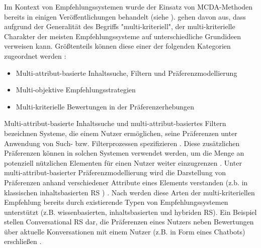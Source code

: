 Im Kontext von Empfehlungssystemen wurde der Einsatz von \ac{MCDA}-Metho\-den bereits in einigen Veröffentlichungen behandelt (siehe \cite{adomavicius:inproceedings:2}\cite{adomavicius:4:inbook}\cite{hdioud:inproceedings}\cite{lakiotaki:article}\cite{manouselis:article}\cite{zheng:inproceedings}).
\textcite[S. 849]{adomavicius:4:inbook} gehen davon aus, dass aufgrund der Generalität des Begriffs "multi-kriteriell", der multi-kriterielle Charakter \cite[S. 10]{adomavicius:5:inbook} der meisten Empfehlungssysteme auf unterschiedliche Grundideen verweisen kann.
Größtenteils können diese einer der folgenden Kategorien zugeordnet werden \cite[S. 10]{adomavicius:5:inbook}\cite[S. 849]{adomavicius:4:inbook}:
\begin{itemize}
    \item Multi-attribut-basierte Inhaltssuche, Filtern und Präferenzmodellierung
    \item Multi-objektive Empfehlungsstrategien
    \item Multi-kriterielle Bewertungen in der Präferenzerhebungen
\end{itemize}

Multi-attribut-basierte Inhaltssuche und multi-attribut-basiertes Filtern bezeichnen Systeme, die einem Nutzer ermöglichen, seine Präferenzen unter Anwendung von Such- bzw. Filterprozessen spezifizieren \cite[S. 851]{adomavicius:4:inbook}\cite[S. 10]{adomavicius:5:inbook}.
Diese zusätzlichen Präferenzen können in solchen Systemen verwendet werden, um die Menge an potenziell nützlichen Elementen für einen Nutzer weiter einzugrenzen \cite[S. 11]{adomavicius:5:inbook}.
Unter multi-attribut-basierter Präferenzmodellierung wird die Darstellung von Präferenzen anhand verschiedener Attribute eines Elements verstanden (z.b. in klassischen inhaltsbasierten \ac{RS} \cite[S. 205]{hdioud:inproceedings}) \cite[S. 10]{adomavicius:5:inbook}.
Nach \textcite[S. 850]{adomavicius:4:inbook} werden diese Arten der multi-kriteriellen Empfehlung bereits durch existierende Typen von Empfehlungssystemen unterstützt (z.B. wissenbasierten, inhaltsbasierten und hybriden \ac{RS}).
Ein Beispiel stellen Conversational \ac{RS} dar, die Präferenzen eines Nutzers neben Bewertungen über aktuelle Konversationen mit einem Nutzer (z.B. in Form eines Chatbots) erschließen \cite[S. 1]{yueming:article}.

